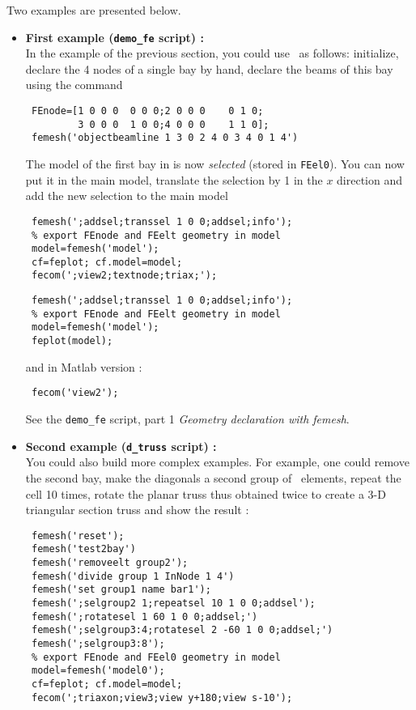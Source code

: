 Two examples are presented below.
\begin{itemize}
\item \textbf{First example ({\tt demo\_fe} script) :}\\
In the example of the previous section, you could use \femesh\ as follows: initialize, declare the 4 nodes of a single bay by hand, declare the beams of this bay using the  command

\begin{verbatim}
 FEnode=[1 0 0 0  0 0 0;2 0 0 0    0 1 0;
         3 0 0 0  1 0 0;4 0 0 0    1 1 0];
 femesh('objectbeamline 1 3 0 2 4 0 3 4 0 1 4')
\end{verbatim}

The model of the first bay in is now {\sl selected} (stored in {\tt FEel0}). You can now put it in the main model, translate the selection by 1 in the $x$ direction and add the new selection to the main model

\begin{SDT}
\begin{verbatim}
 femesh(';addsel;transsel 1 0 0;addsel;info');
 % export FEnode and FEelt geometry in model
 model=femesh('model'); 
 cf=feplot; cf.model=model;
 fecom(';view2;textnode;triax;');
\end{verbatim}
\end{SDT}

\begin{OPENFEM}
\begin{verbatim}
 femesh(';addsel;transsel 1 0 0;addsel;info');
 % export FEnode and FEelt geometry in model
 model=femesh('model');  
 feplot(model);
\end{verbatim}
and in Matlab version :
\begin{verbatim}
 fecom('view2');
\end{verbatim}
\end{OPENFEM}
See the {\tt demo\_fe} script, part 1 {\sl Geometry declaration with femesh}.

\item \textbf{Second example ({\tt d\_truss} script) :}\\
You could also build more complex examples. For example, one could remove the second bay, make the diagonals a second group of \bare\ elements, repeat the cell 10 times, rotate the planar truss thus obtained twice to create a 3-D triangular section truss and show the result :

\begin{SDT}
\begin{verbatim}
 femesh('reset');
 femesh('test2bay')
 femesh('removeelt group2');
 femesh('divide group 1 InNode 1 4')
 femesh('set group1 name bar1');
 femesh(';selgroup2 1;repeatsel 10 1 0 0;addsel');
 femesh(';rotatesel 1 60 1 0 0;addsel;')
 femesh(';selgroup3:4;rotatesel 2 -60 1 0 0;addsel;')
 femesh(';selgroup3:8');
 % export FEnode and FEel0 geometry in model
 model=femesh('model0'); 
 cf=feplot; cf.model=model;
 fecom(';triaxon;view3;view y+180;view s-10');
\end{verbatim}
\end{SDT}


\end{itemize}
